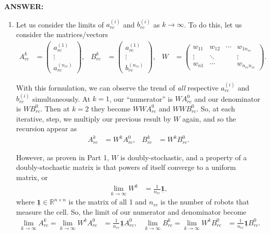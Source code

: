 \documentclass[12pt]{article}
\begin{document}
\noindent\textbf{ANSWER:}
\begin{enumerate}[label=(\alph*)]
    \item Let us consider the limits of $a_{rc}^{(i)}$ and $b_{rc}^{(i)}$ as $k\to\infty$. To do this, let us consider the matrices/vectors
    \begin{align*}
        A_{rc}^k&=\begin{pmatrix}
            a_{rc}^{(1)}\\\vdots\\a_{rc}^{(n_{rc})}
        \end{pmatrix}, & B_{rc}^k&=\begin{pmatrix}
            a_{rc}^{(1)}\\\vdots\\b_{rc}^{(n_{rc})}
        \end{pmatrix}, & W&=\begin{pmatrix}
            w_{11} & w_{12} & \cdots & w_{1n_{rc}}\\
            \vdots & \ddots &  & \vdots\\
            w_{n1} & \cdots & & w_{n_{rc}n_{rc}}
        \end{pmatrix}.
    \end{align*}

    With this formulation, we can observe the trend of \textit{all} respective $a_{rc}^{(i)}$ and $b_{rc}^{(i)}$ simultaneously. At $k=1$, our ``numerator'' is $WA_{rc}^0$ and our denominator is $WB_{rc}^0$. Then at $k=2$ they become $WWA_{rc}^0$ and $WWB_{rc}^0$. So, at each iterative, step, we multiply our previous result by $W$ again, and so the recursion appear as
    \begin{align*}
        A_{rc}^k&=W^kA_{rc}^0, & B_{rc}^k&=W^kB_{rc}^0.
    \end{align*}

    However, as proven in Part 1, $W$ is doubly-stochastic, and a property of a doubly-stochastic matrix is that powers of itself converge to a uniform matrix, or
    \begin{align*}
        \lim_{k\to\infty}W^k&=\frac{1}{n_{rc}}\underline{\mathbf1},
    \end{align*}
    where $\underline{\mathbf1}\in\mathbb R^{n\times n}$ is the matrix of all 1 and $n_{rc}$ is the number of robots that measure the cell. So, the limit of our numerator and denominator become
    \begin{align*}
        \lim_{k\to\infty}A_{rc}^k=\lim_{k\to\infty}W^kA_{rc}^0&=\frac{1}{n_{rc}}\underline{\mathbf 1}A_{rc}^0, & \lim_{k\to\infty}B_{rc}^k=\lim_{k\to\infty}W^kB_{rc}^0&=\frac{1}{n_{rc}}\underline{\mathbf 1}B_{rc}^0.
    \end{align*}


\end{enumerate}
\end{document}
